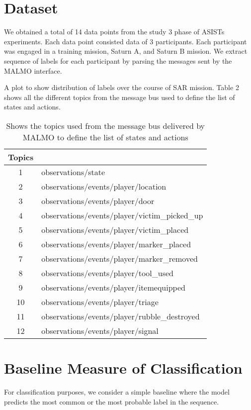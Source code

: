 \documentclass{article}
\begin{document}
\section*{Dataset}
We obtained a total of 14 data points from the study 3 phase of ASISTs experiments.
Each data point consisted data of 3 participants. Each participant was engaged in
a training mission, Saturn A, and Saturn B mission.
We extract sequence of labels for each participant by parsing the messages sent by 
the MALMO interface.

A plot to show distribution of labels over the course of SAR mission. Table 2 
shows all the different topics from the message bus used to define the list 
of states and actions.

\begin{table}[h!]
    \centering
    \begin{tabular}{|c|l|}
    \hline
    \textbf{Topics} \\[1em]
    \hline
    1 & observations/state \\[0.5em]
    2 & observations/events/player/location \\[0.5em]
    3 & observations/events/player/door \\[0.5em]
    4 & observations/events/player/victim\_picked\_up \\[0.5em]
    5 & observations/events/player/victim\_placed \\[0.5em]
    6 & observations/events/player/marker\_placed \\[0.5em]
    7 & observations/events/player/marker\_removed \\[0.5em]
    8 & observations/events/player/tool\_used \\[0.5em]
    9 & observations/events/player/itemequipped \\[0.5em]
    10 & observations/events/player/triage \\[0.5em] 
    11 & observations/events/player/rubble\_destroyed \\[0.5em]
    12 & observations/events/player/signal \\[0.5em]
    \hline
    \end{tabular}
    \caption{Shows the topics used from the message bus delivered by MALMO 
    to define the list of states and actions}
    \label{table:2}
\end{table}


\section*{Baseline Measure of Classification}
For classification purposes, we consider a simple baseline where the model predicts
the most common or the most probable label in the sequence.

\printbibliography 
\end{document}
